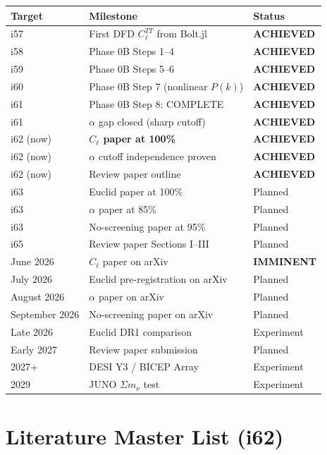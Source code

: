 \documentclass[11pt,a4paper]{article}
\begin{document}
\begin{center}
\begin{longtable}{lll}
\toprule
\textbf{Target} & \textbf{Milestone} & \textbf{Status} \\
\midrule
i57 & First DFD $C_\ell^{TT}$ from Bolt.jl & \textbf{ACHIEVED} \\
i58 & Phase 0B Steps 1--4 & \textbf{ACHIEVED} \\
i59 & Phase 0B Steps 5--6 & \textbf{ACHIEVED} \\
i60 & Phase 0B Step 7 (nonlinear $P(k)$) & \textbf{ACHIEVED} \\
i61 & Phase 0B Step 8: COMPLETE & \textbf{ACHIEVED} \\
i61 & $\alpha$ gap closed (sharp cutoff) & \textbf{ACHIEVED} \\
i62 (now) & \textbf{$C_\ell$ paper at 100\%} & \textbf{ACHIEVED} \\
i62 (now) & $\alpha$ cutoff independence proven & \textbf{ACHIEVED} \\
i62 (now) & Review paper outline & \textbf{ACHIEVED} \\
\midrule
i63 & Euclid paper at 100\% & Planned \\
i63 & $\alpha$ paper at 85\% & Planned \\
i63 & No-screening paper at 95\% & Planned \\
i65 & Review paper Sections I--III & Planned \\
\midrule
June 2026 & $C_\ell$ paper on arXiv & \textbf{IMMINENT} \\
July 2026 & Euclid pre-registration on arXiv & Planned \\
August 2026 & $\alpha$ paper on arXiv & Planned \\
September 2026 & No-screening paper on arXiv & Planned \\
Late 2026 & Euclid DR1 comparison & Experiment \\
Early 2027 & Review paper submission & Planned \\
2027+ & DESI Y3 / BICEP Array & Experiment \\
2029 & JUNO $\Sigma m_\nu$ test & Experiment \\
\bottomrule
\end{longtable}
\end{center}


\section{Literature Master List (i62)}
\label{sec:literature}
\end{document}
